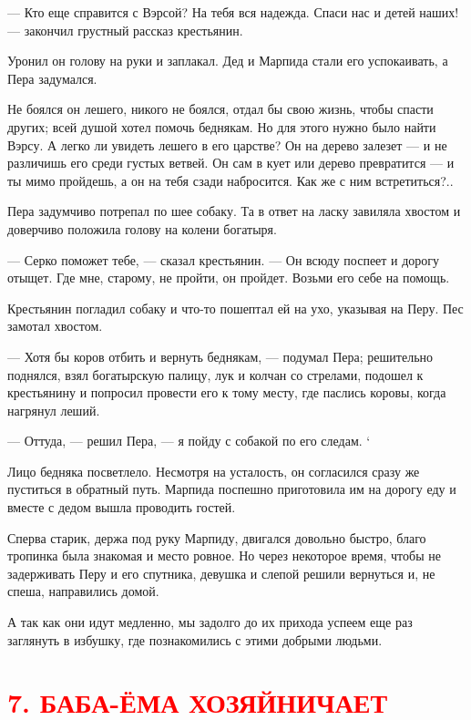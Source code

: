 \documentclass[oneside,final,14pt]{extreport}
\begin{document}
	— Кто еще справится с Вэрсой? На тебя вся надежда. Спаси нас и детей наших! — закончил грустный рассказ крестьянин.
	
	Уронил он голову на руки и заплакал. Дед и Марпида стали его успокаивать, а Пера задумался.
	
	Не боялся он лешего, никого не боялся, отдал бы свою жизнь, чтобы спасти других; всей душой хотел помочь беднякам. Но для этого нужно было найти Вэрсу. А легко ли увидеть лешего в его царстве? Он на дерево залезет — и не различишь его среди густых ветвей. Он сам в кует или дерево превратится — и ты мимо пройдешь, а он на тебя сзади набросится. Как же с ним встретиться?..
	
	Пера задумчиво потрепал по шее собаку. Та в ответ на ласку завиляла хвостом и доверчиво положила голову на колени богатыря.
	
	— Серко поможет тебе, — сказал крестьянин. — Он всюду поспеет и дорогу отыщет. Где мне, старому, не пройти, он пройдет. Возьми его себе на помощь.
	
	Крестьянин погладил собаку и что-то пошептал ей на ухо, указывая на Перу. Пес замотал хвостом.
	
	— Хотя бы коров отбить и вернуть беднякам, — подумал Пера; решительно поднялся, взял богатырскую палицу, лук и колчан со стрелами, подошел к крестьянину и попросил провести его к тому месту, где паслись коровы, когда нагрянул леший.
	
	— Оттуда, — решил Пера, — я пойду с собакой по его следам. `
	
	Лицо бедняка посветлело. Несмотря на усталость, он согласился сразу же пуститься в обратный путь. Марпида поспешно приготовила им на дорогу еду и вместе с дедом вышла проводить гостей.
	
	Сперва старик, держа под руку Марпиду, двигался довольно быстро, благо тропинка была знакомая и место ровное. Но через некоторое время, чтобы не задерживать Перу и его спутника, девушка и слепой решили вернуться и, не спеша, направились домой.
	
	А так как они идут медленно, мы задолго до их прихода успеем еще раз заглянуть в избушку, где познакомились с этими добрыми людьми.
	
	\section[7. Баба-Ёма хозяйничает]{\center \textcolor{red}{7. БАБА-ЁМА ХОЗЯЙНИЧАЕТ}}
	
\end{document}
